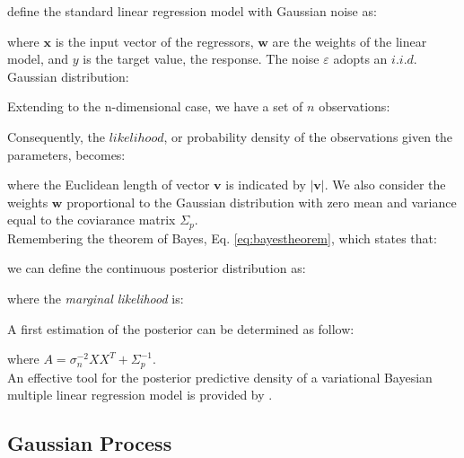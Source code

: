 \citet{RefWorks:192, RefWorks:110} define the standard linear
regression model with Gaussian noise as:

where $\mathbf{x}$ is the input vector of the regressors, $\mathbf{w}$ are the
weights of the linear model, and $y$ is the target value, the response. The
noise $\varepsilon$ adopts an $i.i.d.$ Gaussian distribution:

Extending to the n-dimensional case, we have a set of $n$ observations:

Consequently, the $likelihood$, or probability density of the observations given
the parameters, becomes:

where the Euclidean length of vector $\mathbf{v}$ is indicated by
$|\mathbf{v}|$.
We also consider the weights $\mathbf{w}$ proportional to the Gaussian
distribution with zero mean and variance equal to the coviarance matrix
$\Sigma_p$.\\
Remembering the theorem of Bayes, Eq. \ref{eq:bayestheorem}, which states that:

we can define the continuous posterior distribution as:

where the \textit{marginal likelihood} is:

A first estimation of the posterior can be determined as follow:

where $A = \sigma_n^{-2} X X^T + \Sigma_p^{-1}$.\\
An effective tool for the posterior predictive density of a variational Bayesian
multiple linear regression model is provided by \citet{RefWorks:193}.



\subsection{Gaussian Process}
\label{subsec:gaussianprocess}

